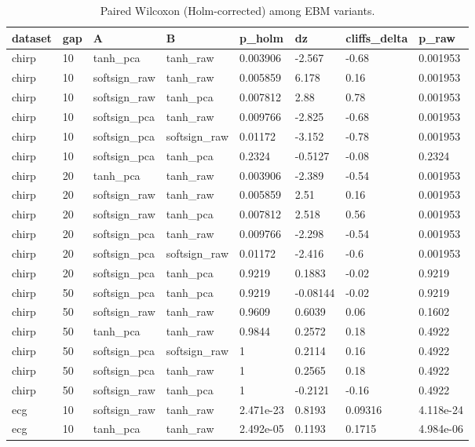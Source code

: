 \begin{table}[t]
\centering
\caption{Paired Wilcoxon (Holm-corrected) among EBM variants.}
\label{tab:sig_ebm_variants}
\begin{tabular}{llllllll}
\toprule
dataset & gap & A & B & p_holm & dz & cliffs_delta & p_raw \\
\midrule
chirp & 10 & tanh_pca & tanh_raw & 0.003906 & -2.567 & -0.68 & 0.001953 \\
chirp & 10 & softsign_raw & tanh_raw & 0.005859 & 6.178 & 0.16 & 0.001953 \\
chirp & 10 & softsign_raw & tanh_pca & 0.007812 & 2.88 & 0.78 & 0.001953 \\
chirp & 10 & softsign_pca & tanh_raw & 0.009766 & -2.825 & -0.68 & 0.001953 \\
chirp & 10 & softsign_pca & softsign_raw & 0.01172 & -3.152 & -0.78 & 0.001953 \\
chirp & 10 & softsign_pca & tanh_pca & 0.2324 & -0.5127 & -0.08 & 0.2324 \\
chirp & 20 & tanh_pca & tanh_raw & 0.003906 & -2.389 & -0.54 & 0.001953 \\
chirp & 20 & softsign_raw & tanh_raw & 0.005859 & 2.51 & 0.16 & 0.001953 \\
chirp & 20 & softsign_raw & tanh_pca & 0.007812 & 2.518 & 0.56 & 0.001953 \\
chirp & 20 & softsign_pca & tanh_raw & 0.009766 & -2.298 & -0.54 & 0.001953 \\
chirp & 20 & softsign_pca & softsign_raw & 0.01172 & -2.416 & -0.6 & 0.001953 \\
chirp & 20 & softsign_pca & tanh_pca & 0.9219 & 0.1883 & -0.02 & 0.9219 \\
chirp & 50 & softsign_pca & tanh_pca & 0.9219 & -0.08144 & -0.02 & 0.9219 \\
chirp & 50 & softsign_raw & tanh_raw & 0.9609 & 0.6039 & 0.06 & 0.1602 \\
chirp & 50 & tanh_pca & tanh_raw & 0.9844 & 0.2572 & 0.18 & 0.4922 \\
chirp & 50 & softsign_pca & softsign_raw & 1 & 0.2114 & 0.16 & 0.4922 \\
chirp & 50 & softsign_pca & tanh_raw & 1 & 0.2565 & 0.18 & 0.4922 \\
chirp & 50 & softsign_raw & tanh_pca & 1 & -0.2121 & -0.16 & 0.4922 \\
ecg & 10 & softsign_raw & tanh_raw & 2.471e-23 & 0.8193 & 0.09316 & 4.118e-24 \\
ecg & 10 & tanh_pca & tanh_raw & 2.492e-05 & 0.1193 & 0.1715 & 4.984e-06 \\

\end{tabular}
\end{table}
